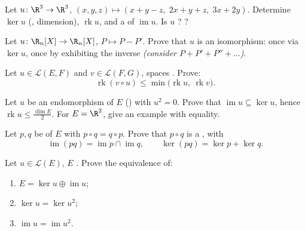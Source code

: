 \begin{exercise}[$\star$]\label{exo:b1:linmaps:2}
Let $u \colon \R^3 \to \R^3$, $(x,y,z) \mapsto (x + y - z,\; 2x + y
+ z,\; 3x + 2y)$. Determine $\ker u$ (, dimension),
$\operatorname{rk} u$, and a  of $\operatorname{im} u$. Is $u$
? ?
\end{exercise}

\begin{exercise}[$\star$]\label{exo:b1:linmaps:3}
Let $u \colon \R_n[X] \to \R_n[X]$, $P \mapsto P - P'$. Prove that
$u$ is an isomorphism: once via $\ker u$, once by exhibiting the
inverse \emph{(consider $P + P' + P'' + \dots$)}.
\end{exercise}

\begin{exercise}[$\star$]\label{exo:b1:linmaps:4}
Let $u \in \mathcal{L}(E, F)$ and $v \in \mathcal{L}(F, G)$, spaces
. Prove:
\[
\operatorname{rk}(v \circ u) \leq
\min\bigl(\operatorname{rk} u,\ \operatorname{rk} v\bigr).
\]
\end{exercise}

\begin{exercise}[$\star\star$]\label{exo:b1:linmaps:5}
Let $u$ be an endomorphism of $E$ () with $u^2 =
0$. Prove that $\operatorname{im} u \subseteq \ker u$, hence
$\operatorname{rk} u \leq \frac{\dim E}{2}$. For $E = \R^2$, give an
example with equality.
\end{exercise}

\begin{exercise}[$\star\star$]\label{exo:b1:linmaps:6}
Let $p, q$ be  of $E$ with $p \circ q = q \circ p$.
Prove that $p \circ q$ is a , with
\[
\operatorname{im}(pq) = \operatorname{im} p \cap \operatorname{im}
q ,
\qquad
\ker (pq) = \ker p + \ker q .
\]
\end{exercise}

\begin{exercise}[$\star\star$]\label{exo:b1:linmaps:7}
Let $u \in \mathcal{L}(E)$, $E$ . Prove the
equivalence of:
\begin{enumerate}
  \item $E = \ker u \oplus \operatorname{im} u$;
  \item $\ker u = \ker u^2$;
  \item $\operatorname{im} u = \operatorname{im} u^2$.
\end{enumerate}
\end{exercise}

